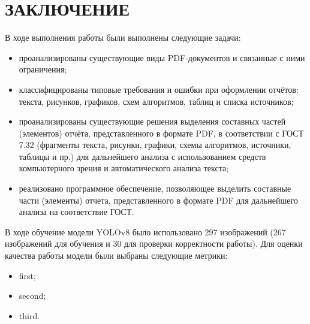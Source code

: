 \chapter*{ЗАКЛЮЧЕНИЕ}

В ходе выполнения работы были выполнены следующие задачи:
\begin{itemize}
	\item проанализированы существующие виды PDF-документов и связанные с ними ограничения;
	\item классифицированы типовые требования и ошибки при оформлении отчётов: текста, рисунков, графиков, схем алгоритмов, таблиц и списка источников;
	\item проанализированы существующие решения выделения составных частей (элементов) отчёта, представленного в формате PDF, в соответствии с ГОСТ 7.32 (фрагменты текста, рисунки, графики, схемы алгоритмов, источники, таблицы и пр.) для дальнейшего анализа с использованием средств компьютерного зрения и автоматического анализа текста;
	\item реализовано программное обеспечение, позволяющее выделить составные части (элементы) отчета, представленного в формате PDF для дальнейшего анализа на соответствие ГОСТ. 
\end{itemize}

В ходе обучение модели YOLOv8 было использовано 297 изображений (267 изображений для обучения и 30 для проверки корректности работы). Для оценки качества работы модели были выбраны следующие метрики:
\begin{itemize}
\item first;
\item second;
\item third.
\end{itemize}

